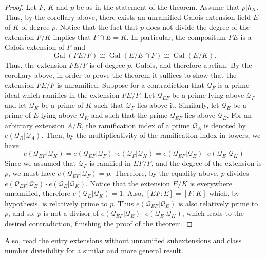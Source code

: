 \documentclass[12pt]{article}
\newcommand{\Gal}{\operatorname{Gal}}
\begin{document}
\begin{proof}
Let $F$, $K$ and $p$ be as in the statement of the theorem. Assume that $p| h_K$. Thus, by the corollary above, there exists an unramified Galois extension field $E$ of $K$ of degree $p$. Notice that the fact that $p$ does not divide the degree of the extension $F/K$ implies that $F\cap E=K$. In particular, the compositum $FE$ is a Galois extension of $F$ and $$\Gal(FE/F)\cong \Gal(E/E\cap F)\cong \Gal(E/K).$$
Thus, the extension $FE/F$ is of degree $p$, Galois, and therefore abelian. By the corollary above, in order to prove the theorem it suffices to show that the extension $FE/F$ is unramified. Suppose for a contradiction that $\mathcal{Q}_F$ is a prime ideal which ramifies in the extension $FE/F$. Let $\mathcal{Q}_{EF}$ be a prime lying above $\mathcal{Q}_F$ and let $\mathcal{Q}_K$ be a prime of $K$ such that $\mathcal{Q}_F$ lies above it. Similarly, let $\mathcal{Q}_E$ be a prime of $E$ lying above $\mathcal{Q}_K$ and such that the prime $\mathcal{Q}_{EF}$ lies above $\mathcal{Q}_E$. For an arbitrary extension $A/B$, the ramification index of a prime $\mathcal{Q}_A$ is denoted by $e(\mathcal{Q}_B|\mathcal{Q}_A)$. Then, by the multiplicativity of the ramification index in towers, we have:
$$e(\mathcal{Q}_{EF}|\mathcal{Q}_K)=e(\mathcal{Q}_{EF}|\mathcal{Q}_F)\cdot e(\mathcal{Q}_{F}|\mathcal{Q}_K)=e(\mathcal{Q}_{EF}|\mathcal{Q}_E)\cdot e(\mathcal{Q}_{E}|\mathcal{Q}_K)$$
Since we assumed that $\mathcal{Q}_F$ is ramified in $EF/F$, and the degree of the extension is $p$, we must have $e(\mathcal{Q}_{EF}|\mathcal{Q}_F)=p$. Therefore, by the equality above, $p$ divides  $e(\mathcal{Q}_{EF}|\mathcal{Q}_E)\cdot e(\mathcal{Q}_{E}|\mathcal{Q}_K)$. Notice that the extension $E/K$ is everywhere unramified, therefore $e(\mathcal{Q}_E|\mathcal{Q}_K)=1$. Also, $[EF:E]=[F:K]$ which, by hypothesis, is relatively prime to $p$. Thus $e(\mathcal{Q}_{EF}|\mathcal{Q}_E)$ is also relatively prime to $p$, and so, $p$ is not a divisor of  $e(\mathcal{Q}_{EF}|\mathcal{Q}_E)\cdot e(\mathcal{Q}_{E}|\mathcal{Q}_K)$, which leads to the desired contradiction, finishing the proof of the theorem.
\end{proof}

Also, read the entry  extensions without unramified subextensions and class number divisibility  for a similar and more general result.
\end{document}
